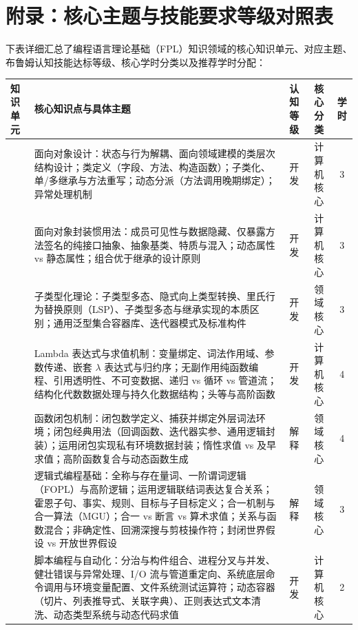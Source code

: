 \clearpage
\onecolumn
\section{附录：核心主题与技能要求等级对照表}

下表详细汇总了编程语言理论基础（FPL）知识领域的核心知识单元、对应主题、布鲁姆认知技能达标等级、核心学时分类以及推荐学时分配：

\noindent\begin{tabularx}{\textwidth}{p{} Y c c c}
\toprule
\textbf{知识单元} & \textbf{核心知识点与具体主题} & \textbf{认知等级} & \textbf{核心分类} & \textbf{学时} \\
\midrule
{} 
& 面向对象设计：状态与行为解耦、面向领域建模的类层次结构设计；类定义（字段、方法、构造函数）；子类化、单/多继承与方法重写；动态分派（方法调用晚期绑定）；异常处理机制 & 开发 & 计算机核心 & 3 \\
& 面向对象封装惯用法：成员可见性与数据隐藏、仅暴露方法签名的纯接口抽象、抽象基类、特质与混入；动态属性 vs 静态属性；组合优于继承的设计原则 & 开发 & 计算机核心 & 3 \\
& 子类型化理论：子类型多态、隐式向上类型转换、里氏行为替换原则（LSP）、子类型多态与继承实现的本质区别；通用泛型集合容器库、迭代器模式及标准构件 & 开发 & 领域核心 & 3 \\
\midrule
{} 
& Lambda 表达式与求值机制：变量绑定、词法作用域、参数传递、嵌套 $\lambda$ 表达式与归约序；无副作用纯函数编程、引用透明性、不可变数据、递归 vs 循环 vs 管道流；结构化代数数据处理与持久化数据结构；头等与高阶函数 & 开发 & 计算机核心 & 4 \\
& 函数闭包机制：闭包数学定义、捕获并绑定外层词法环境；闭包经典用法（回调函数、迭代器实参、通用逻辑封装）；运用闭包实现私有环境数据封装；惰性求值 vs 及早求值；高阶函数复合与动态函数生成 & 解释 & 领域核心 & 4 \\
\midrule
{} 
& 逻辑式编程基础：全称与存在量词、一阶谓词逻辑（FOPL）与高阶逻辑；运用逻辑联结词表达复合关系；霍恩子句、事实、规则、目标与子目标定义；合一机制与合一算法（MGU）；合一 vs 断言 vs 算术求值；关系与函数混合；非确定性、回溯深搜与剪枝操作符；封闭世界假设 vs 开放世界假设 & 解释 & 领域核心 & 3 \\
\midrule
{} 
& 脚本编程与自动化：分治与构件组合、进程分叉与并发、健壮错误与异常处理、I/O 流与管道重定向、系统底层命令调用与环境变量配置、文件系统测试运算符；动态容器（切片、列表推导式、关联字典）、正则表达式文本清洗、动态类型系统与动态代码求值 & 开发 & 计算机核心 & 2 \\

\end{tabularx}
